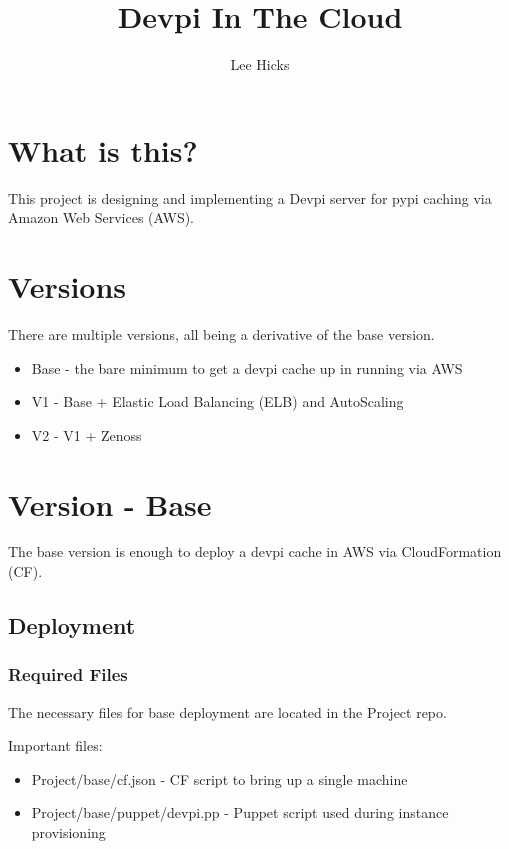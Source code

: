 \documentclass[12pt, letterpaper]{article}
\begin{document}
\title{Devpi In The Cloud}
\author{Lee Hicks}

\maketitle

\section{What is this?}
This project is designing and implementing a Devpi server for pypi caching via Amazon Web Services (AWS).

\section{Versions}
There are multiple versions, all being a derivative of the base version.

\begin{itemize}
    \item Base - the bare minimum to get a devpi cache up in running via AWS 
    \item V1 - Base + Elastic Load Balancing (ELB) and AutoScaling
    \item V2 - V1 + Zenoss 
\end{itemize}

\section{Version - Base}
The base version is enough to deploy a devpi cache in AWS via CloudFormation (CF).

\subsection{Deployment}

\subsubsection{Required Files}
The necessary files for base deployment are located in the Project repo.

Important files:
\begin{itemize}
    \item Project/base/cf.json - CF script to bring up a single machine
    \item Project/base/puppet/devpi.pp - Puppet script used during instance provisioning
\end{itemize}
\end{document}
